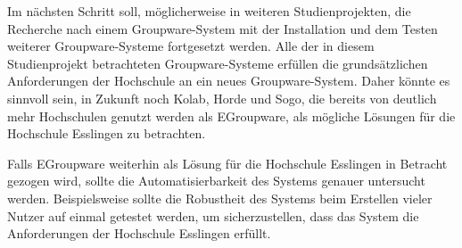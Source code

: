 Im nächsten Schritt soll, möglicherweise in weiteren Studienprojekten, die Recherche nach einem Groupware-System mit der Installation und dem Testen weiterer Groupware-Systeme fortgesetzt werden.
Alle der in diesem Studienprojekt betrachteten Groupware-Systeme erfüllen die grundsätzlichen Anforderungen der Hochschule an ein neues Groupware-System.
Daher könnte es sinnvoll sein, in Zukunft noch Kolab, Horde und Sogo, die bereits von deutlich mehr Hochschulen genutzt werden als EGroupware, als mögliche Lösungen für die Hochschule Esslingen zu betrachten.

Falls EGroupware weiterhin als Lösung für die Hochschule Esslingen in Betracht gezogen wird, sollte die Automatisierbarkeit des Systems genauer untersucht werden.
Beispielsweise sollte die Robustheit des Systems beim Erstellen vieler Nutzer auf einmal getestet werden, um sicherzustellen, dass das System die Anforderungen der Hochschule Esslingen erfüllt.


